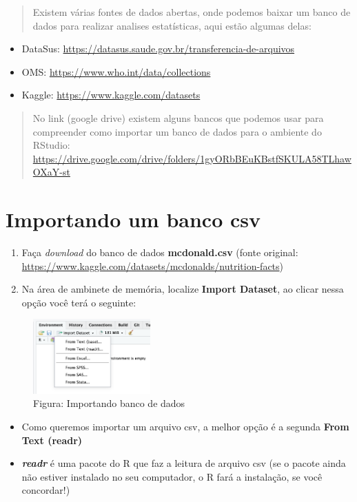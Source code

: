 \documentclass[
]{book}
\begin{document}
\begin{quote}
Existem várias fontes de dados abertas, onde podemos baixar um banco de dados para realizar analises estatísticas, aqui estão algumas delas:
\end{quote}

\begin{itemize}
\item
  DataSus: \url{https://datasus.saude.gov.br/transferencia-de-arquivos}
\item
  OMS: \url{https://www.who.int/data/collections}
\item
  Kaggle: \url{https://www.kaggle.com/datasets}
\end{itemize}

\begin{quote}
No link (google drive) existem alguns bancos que podemos usar para compreender como importar um banco de dados para o ambiente do RStudio: \url{https://drive.google.com/drive/folders/1gyORbBEuKBstfSKULA58TLhawOXaY-st}
\end{quote}

\section{Importando um banco csv}\label{importando-um-banco-csv}

\begin{enumerate}
\def\labelenumi{\arabic{enumi}.}
\item
  Faça \emph{download} do banco de dados \textbf{mcdonald.csv}
  (fonte original: \url{https://www.kaggle.com/datasets/mcdonalds/nutrition-facts})
\item
  Na área de ambinete de memória, localize \textbf{Import Dataset}, ao clicar nessa opção você terá o seguinte:
\end{enumerate}

\begin{figure}
\centering
\includegraphics[width=0.4\textwidth,height=\textheight]{telaImportDataset.png}
\caption{ Figura: Importando banco de dados}
\end{figure}

\begin{itemize}
\item
  Como queremos importar um arquivo csv, a melhor opção é a segunda \textbf{From Text (readr)}
\item
  \textbf{\emph{readr}} é uma pacote do R que faz a leitura de arquivo csv (se o pacote ainda não estiver instalado no seu computador, o R fará a instalação, se você concordar!)
\end{itemize}
\end{document}
